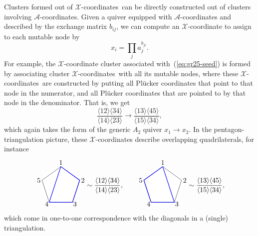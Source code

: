 \documentclass[12pt]{article}
\def\ket#1{\langle #1 \rangle}
\def\x{\mathcal{X}}
\def\xcoords{$\mathcal{X}$-coordinates}
\def\a{\mathcal{A}}
\def\acoords{$\mathcal{A}$-coordinates}
\def\drawLabeledPentagon{
\coordinate (P1) at (90:1);
\coordinate (P2) at (18:1);
\coordinate (P3) at (306:1);
\coordinate (P4) at (234:1);
\coordinate (P5) at (162:1);
\draw[white,fill=white] (0,0) circle (1cm);
\draw (P1) -- (P2) -- (P3) -- (P4) -- (P5) -- cycle;
\draw (0,1.2) node {1};
\draw (.9,.3) node[anchor=west] {2};
\draw (.5,-.9) node[anchor=west] {3};
\draw (-.5,-.9) node[anchor=east] {4};
\draw (-.9,.3) node[anchor=east] {5};
}
\begin{document}
Clusters formed out of \xcoords\ can be directly constructed out of clusters involving \acoords. Given a quiver equipped with $\a$-coordinates and described by the exchange matrix $b_{ij}$, we can compute an $\x$-coordinate to assign to each mutable node by
\begin{equation} \label{eq:x_from_a_coordinates}
	x_i = \prod_j a_j^{b_{ji}}. 	
\end{equation} 
For example, the $\x$-coordinate cluster associated with~(\ref{eq:gr25-seed}) is formed by associating cluster \xcoords\ with all its mutable nodes, where these \xcoords\ are constructed by putting all Pl\"ucker coordinates that point to that node in the numerator, and all Pl\"ucker coordinates that are pointed to by that node in the denominator. That is, we get
\begin{equation} \label{eq:a2_x_seed}
	\frac{\ket{12}\ket{34}}{\ket{14}\ket{23}} \to \frac{\ket{13}\ket{45}}{\ket{15}\ket{34}},
\end{equation}
which again takes the form of the generic $A_2$ quiver $x_1 \to x_2$. In the pentagon-triangulation picture, these $\x$-coordinates describe overlapping quadrilaterals, for instance
\begin{align}\begin{gathered}
\begin{tikzpicture}
  \drawLabeledPentagon
  \draw[color=blue, thick] (P1) -- (P2) -- (P3) -- (P4) -- cycle;
\end{tikzpicture} 
\begin{aligned}
\sim \frac{\ket{12}\ket{34}}{\ket{14}\ket{23}},  \\[1.6cm] \
\end{aligned} \qquad 
\begin{tikzpicture}
  \drawLabeledPentagon
  \draw[color=blue, thick] (P1) -- (P3) -- (P4) -- (P5) -- cycle;
\end{tikzpicture}  
\begin{aligned}
\sim \frac{\ket{13}\ket{45}}{\ket{15}\ket{34}}, \\[1.6cm] \
\end{aligned}
\vspace{-1.4cm}
\end{gathered}
\end{align}
which come in one-to-one correspondence with the diagonals in a (single) triangulation.
\end{document}
